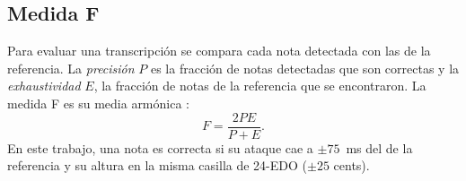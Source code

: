\subsection{Medida F}

Para evaluar una transcripción se compara cada nota detectada con las de la referencia. La \emph{precisión} $P$ es la
fracción de notas detectadas que son correctas y la \emph{exhaustividad} $E$, la fracción de notas de la referencia que se
encontraron. La medida F es su media armónica \citep{vanrijsbergen1979}:
\[
  F = \frac{2PE}{P + E}.
\]
En este trabajo, una nota es correcta si su ataque cae a $\pm 75$~ms del de la referencia y su altura en la misma casilla
de 24-EDO ($\pm 25$ cents).
